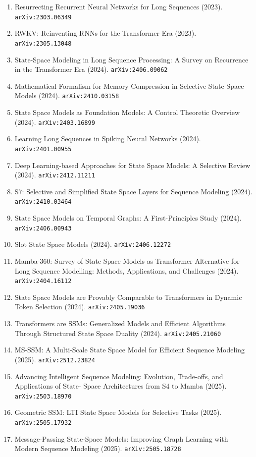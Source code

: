 \documentclass[11pt]{article}
\begin{document}
\begin{enumerate}
  \item Resurrecting Recurrent Neural Networks for Long Sequences (2023). \texttt{arXiv:2303.06349}
  \item RWKV: Reinventing RNNs for the Transformer Era (2023). \texttt{arXiv:2305.13048}
  \item State-Space Modeling in Long Sequence Processing: A Survey on Recurrence in the Transformer Era (2024). \texttt{arXiv:2406.09062}
  \item Mathematical Formalism for Memory Compression in Selective State Space
  Models (2024). \texttt{arXiv:2410.03158}
  \item State Space Models as Foundation Models: A Control Theoretic Overview (2024). \texttt{arXiv:2403.16899}
  \item Learning Long Sequences in Spiking Neural Networks (2024). \texttt{arXiv:2401.00955}
  \item Deep Learning-based Approaches for State Space Models: A Selective
  Review (2024). \texttt{arXiv:2412.11211}
  \item S7: Selective and Simplified State Space Layers for Sequence Modeling (2024). \texttt{arXiv:2410.03464}
  \item State Space Models on Temporal Graphs: A First-Principles Study (2024). \texttt{arXiv:2406.00943}
  \item Slot State Space Models (2024). \texttt{arXiv:2406.12272}
  \item Mamba-360: Survey of State Space Models as Transformer Alternative for
  Long Sequence Modelling: Methods, Applications, and Challenges (2024). \texttt{arXiv:2404.16112}
  \item State Space Models are Provably Comparable to Transformers in Dynamic
  Token Selection (2024). \texttt{arXiv:2405.19036}
  \item Transformers are SSMs: Generalized Models and Efficient Algorithms
  Through Structured State Space Duality (2024). \texttt{arXiv:2405.21060}
  \item MS-SSM: A Multi-Scale State Space Model for Efficient Sequence Modeling (2025). \texttt{arXiv:2512.23824}
  \item Advancing Intelligent Sequence Modeling: Evolution, Trade-offs, and Applications of State- Space Architectures from S4 to Mamba (2025). \texttt{arXiv:2503.18970}
  \item Geometric SSM: LTI State Space Models for Selective Tasks (2025). \texttt{arXiv:2505.17932}
  \item Message-Passing State-Space Models: Improving Graph Learning with Modern Sequence Modeling (2025). \texttt{arXiv:2505.18728}

\end{enumerate}
\end{document}
